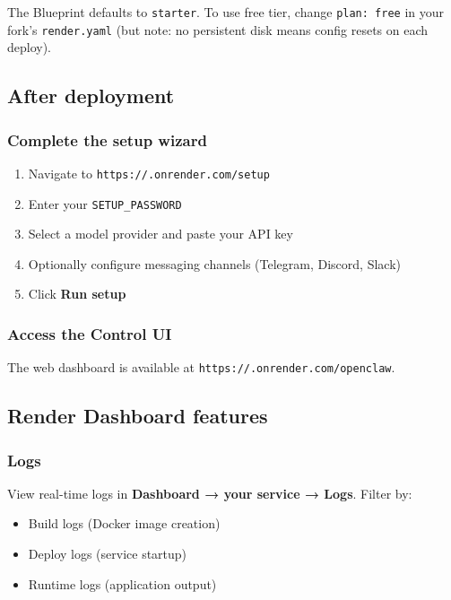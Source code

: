 The Blueprint defaults to \texttt{starter}. To use free tier, change \texttt{plan: free} in your fork's
\texttt{render.yaml} (but note: no persistent disk means config resets on each deploy).

\subsection{After deployment}


\subsubsection{Complete the setup wizard}


\begin{enumerate}
  \item Navigate to \texttt{https://.onrender.com/setup}
  \item Enter your \texttt{SETUP\_PASSWORD}
  \item Select a model provider and paste your API key
  \item Optionally configure messaging channels (Telegram, Discord, Slack)
  \item Click \textbf{Run setup}
\end{enumerate}


\subsubsection{Access the Control UI}


The web dashboard is available at \texttt{https://.onrender.com/openclaw}.

\subsection{Render Dashboard features}


\subsubsection{Logs}


View real-time logs in \textbf{Dashboard → your service → Logs}. Filter by:

\begin{itemize}
  \item Build logs (Docker image creation)
  \item Deploy logs (service startup)
  \item Runtime logs (application output)
\end{itemize}


